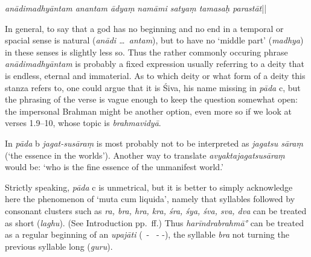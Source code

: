 {{  \textit{anādimadhyāntam anantam ādyaṃ} 
  \textit{namāmi satyaṃ tamasaḥ parastāt}\thinspace ||
  
 
  In general, to say that a god has no beginning and no end in a temporal or spacial sense is natural
  {\rm (}\textit{anādi \dots\ antam}{\rm )}, but to have no `middle part' {\rm (}\textit{madhya}{\rm )} in these senses is slightly less so.
  Thus the rather commonly occuring phrase \textit{anādimadhyāntam} is probably a fixed expression usually 
  referring to a deity that is endless, eternal and immaterial. 
  As to which deity or what form of a deity this stanza refers to, one could argue that 
  it is Śiva, his name missing in \textit{pāda} c, but the phrasing of the verse 
  is vague enough to keep the question somewhat open: the impersonal Brahman 
  might be another option, even more so if we look at verses 1.9--10, whose
  topic is \textit{brahmavidyā}.
 
 
  
 
  In \textit{pāda} b \textit{jagat-susāraṃ} is most probably not 
  to be interpreted as \textit{jagatsu sāraṃ} {\rm (}`the essence in the worlds'{\rm )}.
  Another way to translate \textit{avyaktajagatsusāraṃ} would be: 
  `who is the fine essence of the unmanifest world.'
 
  
 
  Strictly speaking, \textit{pāda} c is unmetrical, but it is better to 
  simply acknowledge here the phenomenon of `muta cum liquida', namely
  that syllables followed by consonant clusters such as 
  \textit{ra, bra, hra, kra, śra, śya, śva, sva, dva} can be treated as short {\rm (}\textit{laghu}{\rm )}.
  {\rm (}See Introduction pp.~\pageref{muta}\thinspace ff.{\rm )}
  Thus \textit{harīndrabrahmā°} can be treated as a regular beginning
  of an \textit{upajāti} {\rm (}\shortsyllable\ - \shortsyllable\ - -{\rm )}, the syllable 
  \textit{bra} not turning the previous syllable long {\rm (}\textit{guru}{\rm )}.
 
  
 
}}
